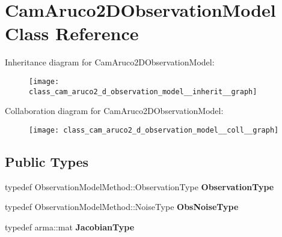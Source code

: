 \hypertarget{class_cam_aruco2_d_observation_model}{\section{\-Cam\-Aruco2\-D\-Observation\-Model \-Class \-Reference}
\label{class_cam_aruco2_d_observation_model}
}


\-Inheritance diagram for \-Cam\-Aruco2\-D\-Observation\-Model\-:\nopagebreak
\begin{figure}[H]
\begin{center}
\leavevmode
\texttt{[image: class\_cam\_aruco2\_d\_observation\_model\_\_inherit\_\_graph]}
\end{center}
\end{figure}


\-Collaboration diagram for \-Cam\-Aruco2\-D\-Observation\-Model\-:\nopagebreak
\begin{figure}[H]
\begin{center}
\leavevmode
\texttt{[image: class\_cam\_aruco2\_d\_observation\_model\_\_coll\_\_graph]}
\end{center}
\end{figure}
\subsection*{\-Public \-Types}
\begin{DoxyCompactItemize}
\item 
\hypertarget{class_cam_aruco2_d_observation_model_a227cf56e4ad62f5fec7c88b5b8c5a403}{typedef \*
\-Observation\-Model\-Method\-::\-Observation\-Type {\bfseries \-Observation\-Type}}\label{class_cam_aruco2_d_observation_model_a227cf56e4ad62f5fec7c88b5b8c5a403}

\item 
\hypertarget{class_cam_aruco2_d_observation_model_a45378bb9e9708b75b6d7cea400c4e179}{typedef \*
\-Observation\-Model\-Method\-::\-Noise\-Type {\bfseries \-Obs\-Noise\-Type}}\label{class_cam_aruco2_d_observation_model_a45378bb9e9708b75b6d7cea400c4e179}

\item 
\hypertarget{class_cam_aruco2_d_observation_model_aabb4595d4a78f07033daee230dd3b7e8}{typedef arma\-::mat {\bfseries \-Jacobian\-Type}}\label{class_cam_aruco2_d_observation_model_aabb4595d4a78f07033daee230dd3b7e8}

\end{DoxyCompactItemize}
